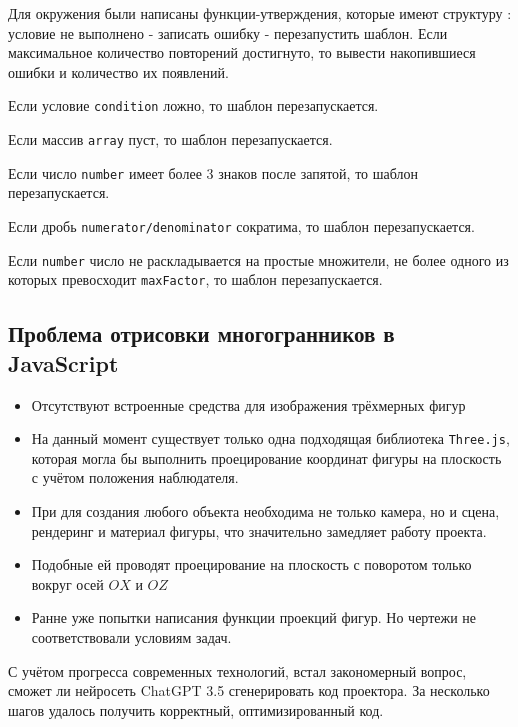 \documentclass[a4paper, 12pt]{extarticle}
\begin{document}
	
	Для окружения были написаны функции-утверждения, которые имеют структуру : условие не выполнено - записать ошибку - перезапустить шаблон. Если максимальное количество повторений достигнуто, то вывести накопившиеся ошибки и количество их появлений. 
	
		Если условие \texttt{condition} ложно, то шаблон перезапускается. 
	
		Если массив \texttt{array} пуст, то шаблон перезапускается.
	
		Если число \texttt{number} имеет более 3 знаков после запятой, то шаблон перезапускается.
		
		Если дробь \texttt{numerator/denominator} сократима, то шаблон перезапускается.
	
		Если \texttt{number} число не раскладывается на простые множители, не более одного из которых превосходит \texttt{maxFactor}, то шаблон перезапускается. 
	
\subsection*{Проблема отрисовки многогранников в JavaScript}

\begin{itemize}
	\item Отсутствуют встроенные средства для изображения трёхмерных фигур
	\item На данный момент существует только одна подходящая библиотека \texttt{Three.js}, которая могла бы выполнить проецирование координат фигуры на плоскость с учётом положения наблюдателя.
	\item При для создания любого объекта необходима не только камера, но и сцена, рендеринг и материал фигуры, что значительно замедляет работу проекта.
	\item Подобные ей проводят проецирование на плоскость с поворотом только вокруг осей $OX$ и $OZ$
	\item Ранне уже попытки написания функции проекций фигур. Но чертежи не соответствовали условиям задач.
\end{itemize}

С учётом прогресса современных технологий, встал закономерный вопрос, сможет ли нейросеть ChatGPT 3.5 сгенерировать код проектора.
За несколько шагов удалось получить корректный, оптимизированный код.
\end{document}
